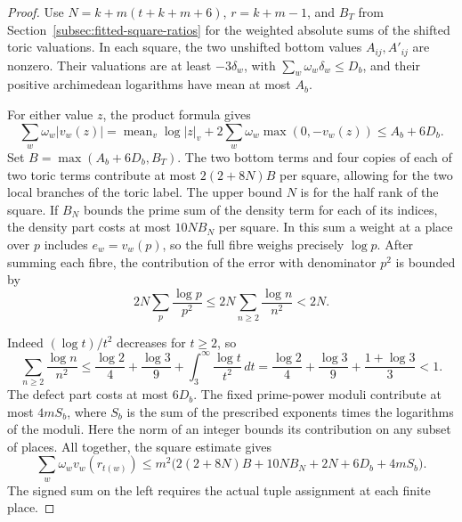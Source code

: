 \begin{proof}
Use \(N=k+m(t+k+m+6)\), \(r=k+m-1\), and \(B_T\)
from Section~\ref{subsec:fitted-square-ratios} for the
weighted absolute sums of the shifted toric valuations.
In each square, the two unshifted
bottom values \(A_{ij},A'_{ij}\) are nonzero. Their
valuations are at least \(-3\delta_w\), with
\(\sum_w\omega_w\delta_w\le D_b\), and their positive
archimedean logarithms have mean at most \(A_b\).

For
either value \(z\), the product formula gives
\[
 \sum_w\omega_w |v_w(z)|
 =\operatorname{mean}_v\log|z|_v+
   2\sum_w\omega_w\max(0,-v_w(z))
 \le A_b+6D_b.
\]
Set \(B=\max(A_b+6D_b,B_T)\). The two bottom terms and
four copies of each of two toric terms contribute at most
\(2(2+8N)B\) per square, allowing for the two local branches
of the toric label. The upper bound \(N\) is for the
half rank of the square. If \(B_N\) bounds the prime sum
of the density term for each of its indices, the density
part costs at most \(10NB_N\) per square. In this sum a
weight at a place over \(p\) includes \(e_w=v_w(p)\), so
the full fibre weighs precisely \(\log p\).
After summing each fibre, the contribution of the error with denominator \(p^2\) is bounded by
\[
  2N\sum_p\frac{\log p}{p^2}\le2N\sum_{n\ge2}\frac{\log n}{n^2}<2N.
\]

Indeed \((\log t)/t^2\) decreases for \(t\ge2\), so
\[
 \sum_{n\ge2}\frac{\log n}{n^2}\le
 \frac{\log2}{4}+\frac{\log3}{9}
   +\int_3^\infty\frac{\log t}{t^2}\,dt
 =\frac{\log2}{4}+\frac{\log3}{9}+\frac{1+\log3}{3}<1.
\] The defect part costs at most
\(6D_b\). The fixed prime-power moduli contribute at most
\(4mS_b\), where \(S_b\) is the sum of the prescribed
exponents times the logarithms of the moduli. Here the
norm of an integer bounds its contribution on any subset
of places. All together, the square estimate gives
\begin{equation}\label{eq:fitted-grid-sum}
 \sum_w\omega_w v_w(r_{t(w)})
 \le m^2\bigl(2(2+8N)B+10NB_N+2N+6D_b+4mS_b\bigr).
\end{equation}
The signed sum on the left requires the actual tuple
assignment at each finite place.


\end{proof}
